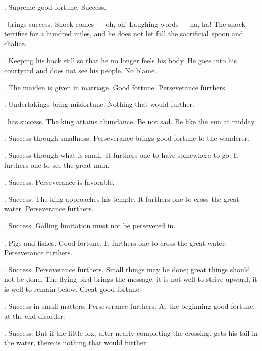 {\nameit. Supreme good fortune.
 Success.}

{\nameit\ brings success.
 Shock comes --- oh, oh!
 Laughing words --- ha, ha!
 The shock terrifies for a hundred miles,
 and he does not let fall the sacrificial spoon and chalice.}

{\nameit. Keeping his back still
 so that he no longer feels his body.
 He goes into his courtyard
 and does not see his people.
 No blame.}

{\nameit. The maiden
 is given in marriage.
 Good fortune.
 Perseverance furthers.}

{\nameit.
 Undertakings bring misfortune.
 Nothing that would further.}

{\nameit\ has success.
 The king attains abundance.
 Be not sad.
 Be like the sun at midday.}

{\nameit. Success through smallness.
 Perseverance brings good fortune
 to the wanderer.}

{\nameit. Success through what is small.
 It furthers one to have somewhere to go.
 It furthers one to see the great man.}

{\nameit. Success.
 Perseverance is favorable.}

{\nameit. Success.
 The king approaches his temple.
 It furthers one to cross the great water.
 Perseverance furthers.}

{\nameit. Success.
 Galling limitation must not be persevered in.}

{\nameit. Pigs and fishes.
 Good fortune.
 It furthers one to cross the great water.
 Perseverance furthers.}

{\nameit. Success.
 Perseverance furthers.
 Small things may be done; great things should not be done.
 The flying bird brings the message:
 it is not well to strive upward,
 it is well to remain below.
 Great good fortune.}

{\nameit. Success in small matters.
 Perseverance furthers.
 At the beginning good fortune,
 at the end disorder.}

{\nameit. Success.
 But if the little fox, after nearly completing the crossing,
 gets his tail in the water,
 there is nothing that would further.}

\endgroup
\begingroup

\def\mk#1#2{
  \def\nameit{{\noexpand\scshape\csname hexagram#1/translation\endcsname}}
  \expandafter\xdef\csname hexagram#1/image\endcsname{#2}
}

